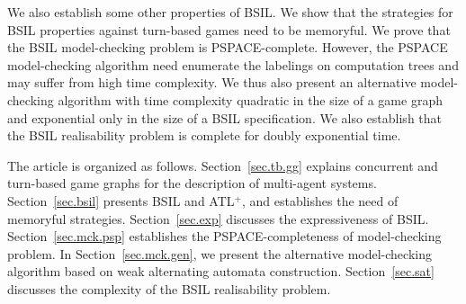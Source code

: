 \documentclass[11pt]{article}
\newcommand{\pfrr}{\Box}
\newcommand{\nxt}{\bigcirc}
\begin{document}
We also establish some other properties of BSIL. 
We show that the strategies  
for BSIL properties against turn-based games need to be memoryful. 
We prove that the BSIL model-checking problem is PSPACE-complete.  
However, the PSPACE model-checking algorithm need enumerate the 
labelings on computation trees and may suffer from high time complexity.  
We thus also present an alternative model-checking algorithm 
with time complexity quadratic in the size of a game graph and 
exponential only in the size of a BSIL specification. 
We also establish that the BSIL realisability problem is complete for
doubly exponential time.  

The article is organized as follows. 
Section~\ref{sec.tb.gg} explains concurrent and 
turn-based game graphs for
the description of multi-agent systems.
Section~\ref{sec.bsil} 
presents BSIL and ATL$^+$, and establishes the need of memoryful strategies. 
Section~\ref{sec.exp} discusses the expressiveness of BSIL. 
Section~\ref{sec.mck.psp} establishes the PSPACE-completeness 
of model-checking problem.  
In Section~\ref{sec.mck.gen}, we present the alternative 
model-checking algorithm based on weak alternating automata construction.  
Section~\ref{sec.sat} discusses the complexity of 
the BSIL realisability problem.  
\end{document}
